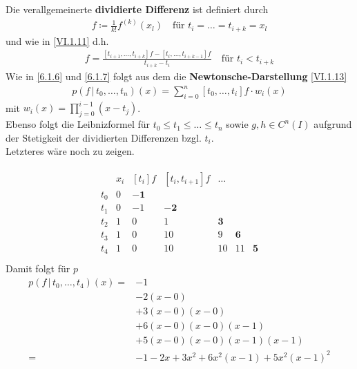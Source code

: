 \begin{Defe}
  Die verallgemeinerte \textbf{dividierte Differenz}
  ist definiert durch 
  \begin{gather*}
    [t_i,\dots, t_{i+k}]f \coloneqq \frac{1}{k!} f^{(k)}(x_l)
    \quad \text{für } t_i=\dots = t_{i+k}=x_l 
  \end{gather*}
  und wie in \eqref{VI.1.11} d.h.
  \begin{gather*}
    [t_i,\dots, t_{i+k}]f = \frac{[t_{i+1},\dots, t_{i+k}]f
      - [t_i,\dots,t_{i+k-1}]f}
    {t_{i+k}-t_i}
    \quad \text{für } t_i<t_{i+k}
  \end{gather*}
  Wie in \ref{6.1.6} und \ref{6.1.7} folgt aus dem 
  die \textbf{Newtonsche-Darstellung} \eqref{VI.1.13}
  \begin{gather*}
    p(f\,|\, t_0,\dots, t_{n})(x) = \sum_{i=0}^{n}[t_0,\dots,t_i]f\cdot w_i(x) 
  \end{gather*}
  mit $w_i(x) =\prod_{j=0}^{i-1}(x-t_j)$.\\
  Ebenso folgt die Leibnizformel für $t_0\leq t_1\leq\dots\leq t_n$
  sowie $g,h\in C^n(I)$ aufgrund der Stetigkeit
  der dividierten Differenzen bzgl. $t_i$.\\
  Letzteres wäre noch zu zeigen.
\end{Defe}


\begin{Bspe}\label{6.1.16}
  \begin{align*}
    \begin{array}{ccccccc}
      &   x_i& [t_i]f & [t_i,t_{i+1}]f &\dots \\
      t_0 &0 & \boldsymbol{-1} \\
      t_1 &0 & -1 & \boldsymbol{-2}\\ 
      t_2 &1 & 0  & 1  &\boldsymbol{3} \\
      t_3 &1 & 0  & 10 &9  &\boldsymbol{6} \\
      t_4 &1 & 0  & 10 &10 &11 & \boldsymbol{5}
    \end{array}\\
  \end{align*}
  Damit folgt für $p$
  \begin{align*}
    p(f\,|\,t_0,\dots, t_4)(x) 
    =& -1\\
     &-2(x-0)\\
     & +3(x-0)(x-0)\\
     & +6(x-0)(x-0)(x-1)\\
     & +5(x-0)(x-0)(x-1)(x-1)\\
    =&-1-2x+3x^2+6x^2(x-1)+5x^2(x-1)^2
  \end{align*}
\end{Bspe}

